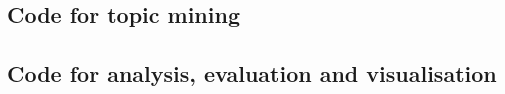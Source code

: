 
\subsection{Code for topic mining}




\subsection{Code for analysis, evaluation and visualisation}



